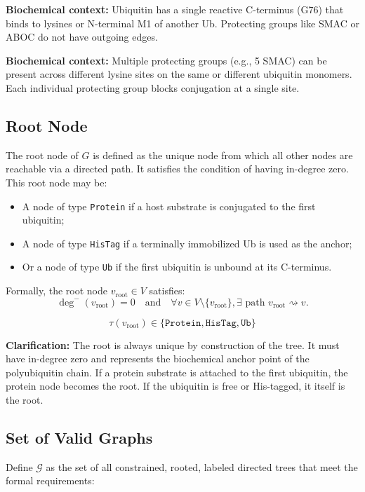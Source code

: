 \documentclass[12pt]{article}
\begin{document}
\textbf{Biochemical context:} Ubiquitin has a single reactive C-terminus (G76) that binds to lysines or N-terminal M1 of another Ub. Protecting groups like SMAC or ABOC do not have outgoing edges.

\textbf{Biochemical context:} Multiple protecting groups (e.g., 5 SMAC) can be present across different lysine sites on the same or different ubiquitin monomers. Each individual protecting group blocks conjugation at a single site.

\subsection*{Root Node}

The root node of \( G \) is defined as the unique node from which all other nodes are reachable via a directed path. It satisfies the condition of having in-degree zero. This root node may be:
\begin{itemize}
    \item A node of type \texttt{Protein} if a host substrate is conjugated to the first ubiquitin;
    \item A node of type \texttt{HisTag} if a terminally immobilized Ub is used as the anchor;
    \item Or a node of type \texttt{Ub} if the first ubiquitin is unbound at its C-terminus.
\end{itemize}

\noindent
Formally, the root node $v_{\text{root}} \in V$ satisfies:
\[
\deg^-(v_{\text{root}}) = 0 \quad \text{and} \quad \forall v \in V \setminus \{v_{\text{root}}\}, \exists \text{ path } v_{\text{root}} \rightsquigarrow v.
\]

\[
\tau(v_{\text{root}}) \in \{\texttt{Protein}, \texttt{HisTag}, \texttt{Ub}\}
\]

\textbf{Clarification:} The root is always unique by construction of the tree. It must have in-degree zero and represents the biochemical anchor point of the polyubiquitin chain. If a protein substrate is attached to the first ubiquitin, the protein node becomes the root. If the ubiquitin is free or His-tagged, it itself is the root.


\subsection*{Set of Valid Graphs}

Define $\mathcal{G}$ as the set of all constrained, rooted, labeled directed trees that meet the formal requirements:
\end{document}
